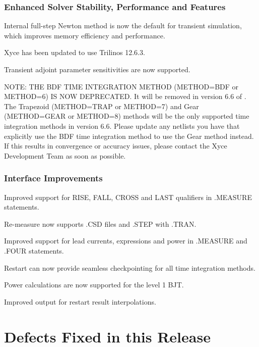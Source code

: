 \documentclass{article}
\begin{document}
\subsubsection*{Enhanced Solver Stability, Performance and Features}
\begin{XyceItemize}
  \item Internal full-step Newton method is now the default for transient simulation, which improves memory efficiency and performance.
  \item Xyce has been updated to use Trilinos 12.6.3.
  \item Transient adjoint parameter sensitivities are now supported.
  \item NOTE: THE BDF TIME INTEGRATION METHOD (METHOD=BDF or METHOD=6) IS NOW DEPRECATED.  It will be removed in version 6.6 of \Xyce{}.  The Trapezoid (METHOD=TRAP or METHOD=7) and Gear (METHOD=GEAR or METHOD=8) methods will be the only supported time integration methods in version 6.6.  Please update any netlists you have that explicitly use the BDF time integration method to use the Gear method instead.  If this results in convergence or accuracy issues, please contact the Xyce Development Team as soon as possible.
\end{XyceItemize}

\subsubsection*{Interface Improvements}
\begin{XyceItemize}
  \item Improved support for RISE, FALL, CROSS and LAST qualifiers in .MEASURE statements.
  \item Re-measure now supports .CSD files and .STEP with .TRAN.
  \item Improved support for lead currents, expressions and power in 
.MEASURE and .FOUR statements.
  \item Restart can now provide seamless checkpointing for all time integration methods.
  \item Power calculations are now supported for the level 1 BJT.
  \item Improved output for restart result interpolations.
\end{XyceItemize}

\newpage
\section{Defects Fixed in this Release}

\end{document}
